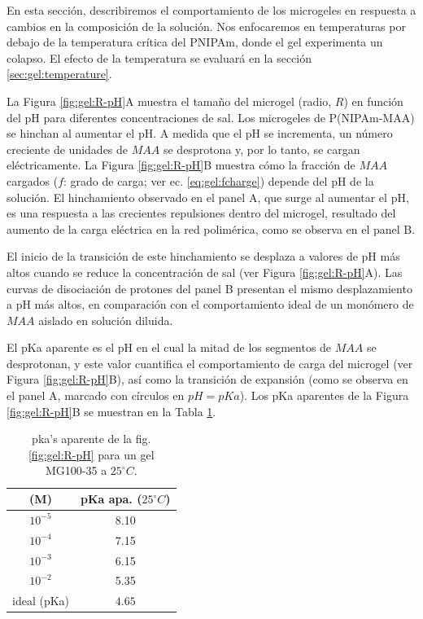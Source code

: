 En esta secci\'on, describiremos el comportamiento de los microgeles en respuesta a cambios en la composici\'on de la soluci\'on. Nos enfocaremos en temperaturas por debajo de la temperatura cr\'itica del PNIPAm, donde el gel experimenta un colapso. El efecto de la temperatura se evaluar\'a en la secci\'on \ref{sec:gel:temperature}.

La Figura \ref{fig:gel:R-pH}A muestra el tama\~no del microgel (radio, $R$) en funci\'on del pH para diferentes concentraciones de sal. Los microgeles de P(NIPAm-MAA) se hinchan al aumentar el pH. A medida que el pH se incrementa, un n\'umero creciente de unidades  de $MAA$ se desprotona y, por lo tanto, se cargan el\'ectricamente. La Figura \ref{fig:gel:R-pH}B muestra c\'omo la fracci\'on de $MAA$ cargados ($f$: grado de carga; ver ec. \ref{eq:gel:fcharge}) depende del pH de la soluci\'on. El hinchamiento observado en el panel A, que surge al aumentar el pH, es una respuesta a las crecientes repulsiones dentro del microgel, resultado del aumento de la carga el\'ectrica en la red polim\'erica, como se observa en el panel B.

El inicio de la transici\'on de este hinchamiento se desplaza a valores de pH m\'as altos cuando se reduce la concentraci\'on de sal (ver Figura \ref{fig:gel:R-pH}A). Las curvas de disociaci\'on de protones del panel B presentan el mismo desplazamiento a pH m\'as altos, en comparaci\'on con el comportamiento ideal de un mon\'omero de $MAA$ aislado en soluci\'on diluida.%

El pKa aparente es el pH en el cual la mitad de los segmentos de $MAA$ se desprotonan, y este valor cuantifica el comportamiento de carga del microgel (ver Figura \ref{fig:gel:R-pH}B), as\'i como la transici\'on de expansi\'on (como se observa en el panel A, marcado con c\'irculos en $pH=pKa$). Los pKa aparentes de la Figura \ref{fig:gel:R-pH}B se muestran en la Tabla \ref{table:gel:pKa_app}.





\begin{table}[!htb]
\centering
\small
  \begin{tabular}{|cc|}
    \hline
      [KCl] (M)&  pKa apa. ($25 ^\circ C$)  \\
      \hline
    $10^{-5}$ & 8.10  \\
    $10^{-4}$ & 7.15 \\
    $10^{-3}$ & 6.15 \\
    $10^{-2}$ & 5.35 \\
    ideal (pKa) &  $4.65$  \\
    \hline
  \end{tabular}
 \caption{ pka's aparente de la fig. \ref{fig:gel:R-pH} para un gel MG100-35 a $25 ^\circ C$.}
\label{table:gel:pKa_app} 
\end{table}


